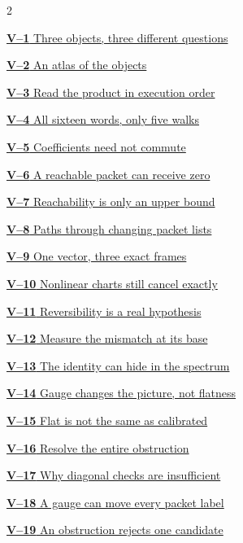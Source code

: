 \documentclass[11pt,a4paper]{article}
\begin{document}
\begin{multicols}{2}
{\small\noindent\hyperlink{vpage1}{\textbf{V--1} Three objects, three different questions}\par\smallskip}
{\small\noindent\hyperlink{vpage2}{\textbf{V--2} An atlas of the objects}\par\smallskip}
{\small\noindent\hyperlink{vpage3}{\textbf{V--3} Read the product in execution order}\par\smallskip}
{\small\noindent\hyperlink{vpage4}{\textbf{V--4} All sixteen words, only five walks}\par\smallskip}
{\small\noindent\hyperlink{vpage5}{\textbf{V--5} Coefficients need not commute}\par\smallskip}
{\small\noindent\hyperlink{vpage6}{\textbf{V--6} A reachable packet can receive zero}\par\smallskip}
{\small\noindent\hyperlink{vpage7}{\textbf{V--7} Reachability is only an upper bound}\par\smallskip}
{\small\noindent\hyperlink{vpage8}{\textbf{V--8} Paths through changing packet lists}\par\smallskip}
{\small\noindent\hyperlink{vpage9}{\textbf{V--9} One vector, three exact frames}\par\smallskip}
{\small\noindent\hyperlink{vpage10}{\textbf{V--10} Nonlinear charts still cancel exactly}\par\smallskip}
{\small\noindent\hyperlink{vpage11}{\textbf{V--11} Reversibility is a real hypothesis}\par\smallskip}
{\small\noindent\hyperlink{vpage12}{\textbf{V--12} Measure the mismatch at its base}\par\smallskip}
{\small\noindent\hyperlink{vpage13}{\textbf{V--13} The identity can hide in the spectrum}\par\smallskip}
{\small\noindent\hyperlink{vpage14}{\textbf{V--14} Gauge changes the picture, not flatness}\par\smallskip}
{\small\noindent\hyperlink{vpage15}{\textbf{V--15} Flat is not the same as calibrated}\par\smallskip}
{\small\noindent\hyperlink{vpage16}{\textbf{V--16} Resolve the entire obstruction}\par\smallskip}
{\small\noindent\hyperlink{vpage17}{\textbf{V--17} Why diagonal checks are insufficient}\par\smallskip}
{\small\noindent\hyperlink{vpage18}{\textbf{V--18} A gauge can move every packet label}\par\smallskip}
{\small\noindent\hyperlink{vpage19}{\textbf{V--19} An obstruction rejects one candidate}\par\smallskip}

\end{multicols}
\end{document}
